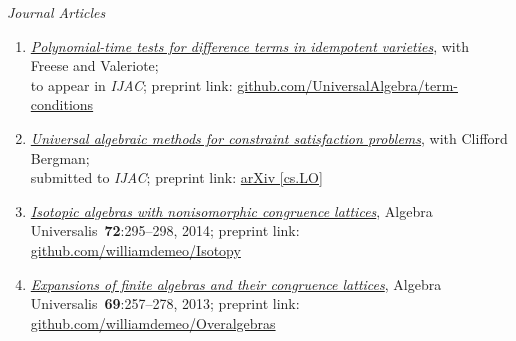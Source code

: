 \newcommand\mmskip{-6mm}

    {\it Journal Articles}%
    \begin{enumerate}
    \item \href{https://github.com/UniversalAlgebra/term-conditions/tree/master/ijac}{{\it Polynomial-time tests for difference terms in idempotent varieties}},
      with Freese and Valeriote;\\
      to appear in {\small {\it IJAC}}; preprint link: \href{https://github.com/UniversalAlgebra/term-conditions/tree/master/DiffTerm}{github.com/UniversalAlgebra/term-conditions}

    \item \href{https://goo.gl/nXC1i9} %
         {{\it Universal algebraic methods for constraint satisfaction problems}},
         with Clifford Bergman;\\
         submitted to {\small {\it IJAC}};
         preprint link: \href{https://arxiv.org/abs/1611.02867}{arXiv [cs.LO]}

    \item \href{https://github.com/williamdemeo/Isotopy}{{\it Isotopic algebras with nonisomorphic congruence lattices}},
    Algebra Universalis~{\bf 72}:295--298, 2014; 
         preprint link: \href{https://github.com/williamdemeo/Isotopy}{github.com/williamdemeo/Isotopy}

    \item \href{https://github.com/williamdemeo/Overalgebras}{{\it Expansions of finite algebras and their congruence lattices}},
    Algebra Universalis~{\bf 69}:257--278, 2013; preprint link: \href{https://github.com/williamdemeo/Overalgebras}{github.com/williamdemeo/Overalgebras}
    \end{enumerate}


